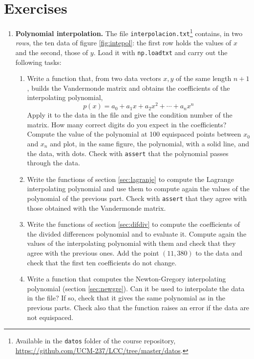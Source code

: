 \section{Exercises}
\begin{enumerate}
\item \textbf{Polynomial interpolation.} The file \texttt{interpolacion.txt}\footnote{Available in the \texttt{datos} folder of the course repository, \url{https://github.com/UCM-237/LCC/tree/master/datos}.} contains, in two \emph{rows}, the ten data of figure \ref{fig:intepol}: the first row holds the values of $x$ and the second, those of $y$. Load it with \texttt{np.loadtxt} and carry out the following tasks:
\begin{enumerate}
\item \label{ej:vander-en} Write a function that, from two data vectors $x,y$ of the same length $n+1$, builds the Vandermonde matrix and obtains the coefficients of the interpolating polynomial,
\begin{equation*}
p(x)=a_0+a_1x+a_2x^2+\cdots+a_nx^n
\end{equation*}
Apply it to the data in the file and give the condition number of the matrix. How many correct digits do you expect in the coefficients? Compute the value of the polynomial at 100 equispaced points between $x_0$ and $x_n$ and plot, in the same figure, the polynomial, with a solid line, and the data, with dots. Check with \texttt{assert} that the polynomial passes through the data.

\item \label{ej:lagrange-en} Write the functions of section \ref{sec:lagranje} to compute the Lagrange interpolating polynomial and use them to compute again the values of the polynomial of the previous part. Check with \texttt{assert} that they agree with those obtained with the Vandermonde matrix.

\item \label{ej:difdiv-en} Write the functions of section \ref{sec:difdiv} to compute the coefficients of the divided differences polynomial and to evaluate it. Compute again the values of the interpolating polynomial with them and check that they agree with the previous ones. Add the point $(11, 380)$ to the data and check that the first ten coefficients do not change.

\item \label{ej:newgre-en} Write a function that computes the Newton-Gregory interpolating polynomial (section \ref{sec:newgre}). Can it be used to interpolate the data in the file? If so, check that it gives the same polynomial as in the previous parts. Check also that the function raises an error if the data are not equispaced.


\end{enumerate}
\end{enumerate}
